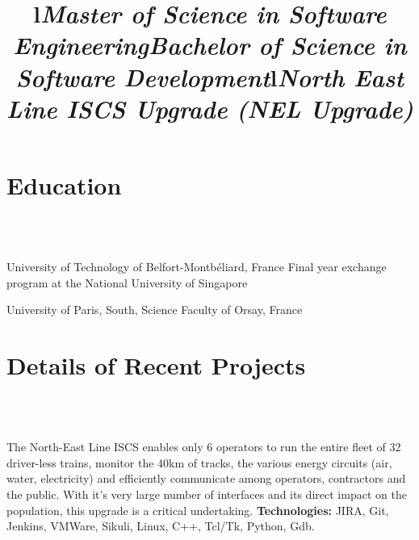 \documentclass[overlapped,line]{res}
\begin{document}
\begin{resume}

  \section{\bf Education}

  \begin{format}
    \title{l}\\
    \body\\
  \end{format}

  \title{\em Master of Science in Software Engineering}
  \begin{position}
    University of Technology of Belfort-Montb\'{e}liard, France\newline
    Final year exchange program at the National University of Singapore
  \end{position}

  \title{\em Bachelor of Science in Software Development}
  \begin{position}
    University of Paris, South, Science Faculty of Orsay, France
  \end{position}


  \section{\bf Details of Recent Projects}

  \begin{format}
    \title{l}\\
    \body\\
  \end{format}

  \title{\em North East Line ISCS Upgrade (NEL Upgrade)}
  \begin{position}
    The North-East Line ISCS enables only 6 operators to run the entire fleet of
    32 driver-less trains, monitor the 40km of tracks, the various energy
    circuits (air, water, electricity) and efficiently communicate among
    operators, contractors and the public. With it's very large number of
    interfaces and its direct impact on the population, this upgrade is a
    critical undertaking.
    \newline
    {\bf Technologies:} JIRA, Git, Jenkins, VMWare, Sikuli, Linux, C++, Tcl/Tk, Python, Gdb.
  \end{position}


\end{resume}
\end{document}
